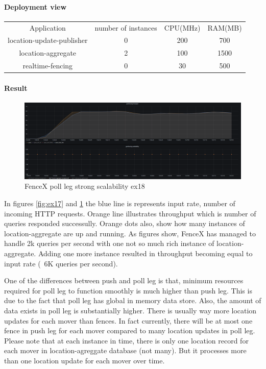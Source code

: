 \documentclass[a4]{report}
\begin{document}
    \paragraph{Deployment view}
    \begin{center}
        \begin{tabular}{ c c c c }
            Application               & number of instances & CPU(MHz) & RAM(MB) \\
            location-update-publisher & 0                   & 200      & 700     \\
            location-aggregate        & 2                   & 100      & 1500    \\
            realtime-fencing          & 0                   & 30       & 500     \\
        \end{tabular}
    \end{center}

    \paragraph{Result}
    \begin{figure}[ht]
        \caption{FenceX poll leg strong scalability ex18}
        \label{fig:ex18}
        \includegraphics[scale=0.4]{images/evaluation/ex18-benchmarking-ongoing-2per4sec.png}
    \end{figure}

    In figures \ref{fig:ex17} and \ref{fig:ex18} the blue line is represents input rate, number of incoming HTTP
    requests.
    Orange line illustrates throughput which is number of queries responded successully.
    Orange dots also, show how many instances of location-aggregate are up and running.
    As figures show, FenceX has managed to handle 2k queries
    per second with one not so much rich instance of location-aggregate.
    Adding one more instance resulted in throughput becoming equal to input rate (~6K queries per second).

    One of the differences between push and poll leg is that, minimum resources required for poll leg to function
    smoothly is much higher than push leg.
    This is due to the fact that poll leg has global in memory data store.
    Also, the amount of data exists in poll leg is substantially higher.
    There is usually way more location updates for each mover than fences.
    In fact currently, there will be at most one fence in push leg for each mover compared to many location updates
    in poll leg.
    Please note that at each instance in time, there is only one location record for each mover in location-agreggate
    database (not many).
    But it processes more than one location update for each mover over time.
\end{document}
